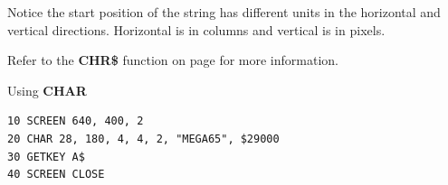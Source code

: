 \begin{description}[leftmargin=2cm,style=nextline]
\item [Remarks:] Notice the start position of the string has different units in the horizontal and vertical directions. Horizontal is in columns and vertical is in pixels.

                 Refer to the {\bf CHR\$} function on page \pageref{BASIC 65 Functions!CHR} for more information.

\item [Example:] Using {\bf CHAR}

\begin{tcolorbox}[colback=black,coltext=white]
\verbatimfont{\codefont}
\begin{verbatim}
10 SCREEN 640, 400, 2
20 CHAR 28, 180, 4, 4, 2, "MEGA65", $29000
30 GETKEY A$
40 SCREEN CLOSE
\end{verbatim}
\end{tcolorbox}
\end{description}


\newpage
